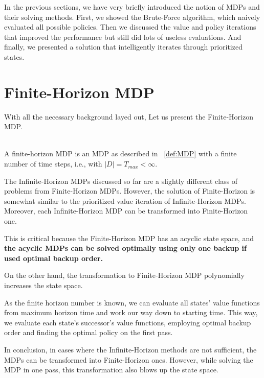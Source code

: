 In the previous sections, we have very briefly introduced the notion of MDPs and their solving methods. First, we showed the Brute-Force algorithm, which naively evaluated all possible policies. Then we discussed the value and policy iterations that improved the performance but still did lots of useless evaluations. And finally, we presented a solution that intelligently iterates through prioritized states. 

\section{Finite-Horizon MDP}

With all the necessary background layed out, Let us present the Finite-Horizon MDP.\\ \\

\begin{definition}
A finite-horizon MDP is an MDP as described in ~\ref{def:MDP} with a finite number of time steps, i.e., with $|D| = T_{max} < \infty$.
\end{definition}


The Infinite-Horizon MDPs discussed so far are a slightly different class of problems from Finite-Horizon MDPs. However, the solution of Finite-Horizon is somewhat similar to the prioritized value iteration of Infinite-Horizon MDPs. 
Moreover, each Infinite-Horizon MDP can be transformed into Finite-Horizon one.

This is critical because the Finite-Horizon MDP has an acyclic state space, and \textbf{the acyclic MDPs can be solved optimally using only one backup if used optimal backup order.} \cite{Kolobov2012}

On the other hand, the transformation to Finite-Horizon MDP polynomially increases the state space.

As the finite horizon number is known, we can evaluate all states' value functions from maximum horizon time and work our way down to starting time. This way, we evaluate each state's successor's value functions, employing optimal backup order and finding the optimal policy on the first pass.

In conclusion, in cases where the Infinite-Horizon methods are not sufficient, the MDPs can be transformed into Finite-Horizon ones. However, while solving the MDP in one pass, this transformation also blows up the state space.

